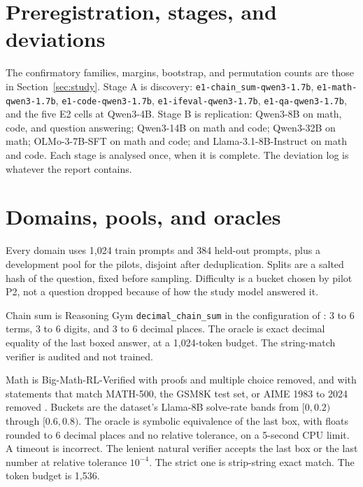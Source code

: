 \section{Preregistration, stages, and deviations}
\label{app:prereg}

The confirmatory families, margins, bootstrap, and permutation counts are those in Section~\ref{sec:study}.
Stage A is discovery: \texttt{e1-chain\_sum-qwen3-1.7b}, \texttt{e1-math-qwen3-1.7b}, \texttt{e1-code-qwen3-1.7b}, \texttt{e1-ifeval-qwen3-1.7b}, \texttt{e1-qa-qwen3-1.7b}, and the five E2 cells at Qwen3-4B.
Stage B is replication: Qwen3-8B on math, code, and question answering; Qwen3-14B on math and code; Qwen3-32B on math; OLMo-3-7B-SFT on math and code; and Llama-3.1-8B-Instruct on math and code.
Each stage is analysed once, when it is complete.
The deviation log is whatever the report contains.



\section{Domains, pools, and oracles}
\label{app:domains}

\begin{table}[t]
\caption{Domains. The natural verifier is what a practitioner would ship. It is not calibrated to the synthetic rate.}
\label{tab:domains}
\centering
\small

\end{table}

Every domain uses 1,024 train prompts and 384 held-out prompts, plus a development pool for the pilots, disjoint after deduplication.
Splits are a salted hash of the question, fixed before sampling.
Difficulty is a bucket chosen by pilot P2, not a question dropped because of how the study model answered it.

Chain sum is Reasoning Gym \texttt{decimal\_chain\_sum} in the configuration of \citet{egashira2026delay}: 3 to 6 terms, 3 to 6 digits, and 3 to 6 decimal places.
The oracle is exact decimal equality of the last boxed answer, at a 1,024-token budget.
The string-match verifier is audited and not trained.

Math is Big-Math-RL-Verified with proofs and multiple choice removed, and with statements that match MATH-500, the GSM8K test set, or AIME 1983 to 2024 removed \citep{albalak2025bigmath}.
Buckets are the dataset's Llama-8B solve-rate bands from $[0, 0.2)$ through $[0.6, 0.8)$.
The oracle is symbolic equivalence of the last box, with floats rounded to 6 decimal places and no relative tolerance, on a 5-second CPU limit.
A timeout is incorrect.
The lenient natural verifier accepts the last box or the last number at relative tolerance $10^{-4}$.
The strict one is strip-string exact match.
The token budget is 1,536.


